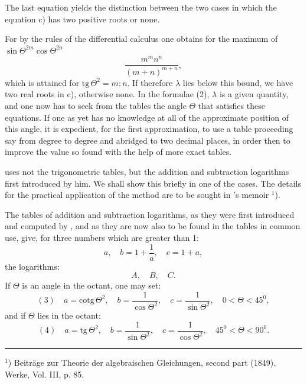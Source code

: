 
The last equation yields the distinction between the two cases in which the equation c) has two positive roots or none.

For by the rules of the differential calculus one obtains for the maximum of $\sin\Theta^{2m}\cos\Theta^{2n}$
\[
\frac{m^m n^n}{(m+n)^{m+n}},
\]
which is attained for $\mathrm{tg}\,\Theta^2 = m:n$. If therefore $\lambda$ lies below this bound, we have two real roots in c), otherwise none. In the formulae (2), $\lambda$ is a given quantity, and one now has to seek from the tables the angle $\Theta$ that satisfies these equations. If one as yet has no knowledge at all of the approximate position of this angle, it is expedient, for the first approximation, to use a table proceeding say from degree to degree and abridged to two decimal places, in order then to improve the value so found with the help of more exact tables.

 uses not the trigonometric tables, but the addition and subtraction logarithms first introduced by him. We shall show this briefly in one of the cases. The details for the practical application of the method are to be sought in 's memoir $^1$).

The tables of addition and subtraction logarithms, as they were first introduced and computed by , and as they are now also to be found in the tables in common use, give, for three numbers which are greater than 1:
\[
a, \quad b = 1+\frac{1}{a}, \quad c = 1+a,
\]
the  logarithms:
\[
A, \quad B, \quad C.
\]
If $\Theta$ is an angle in the  octant, one may set:
\[
(3)\quad a = \mathrm{cotg}\,\Theta^2, \quad b = \frac{1}{\cos\Theta^2}, \quad c = \frac{1}{\sin\Theta^2}, \quad 0 < \Theta < 45^0,
\]
and if $\Theta$ lies in the  octant:
\[
(4)\quad a = \mathrm{tg}\,\Theta^2, \quad b = \frac{1}{\sin\Theta^2}, \quad c = \frac{1}{\cos\Theta^2}, \quad 45^0 < \Theta < 90^0.
\]

\noindent\rule{4cm}{0.4pt}

$^1$) Beiträge zur Theorie der algebraischen Gleichungen, second part (1849).  Werke, Vol. III, p. 85.
